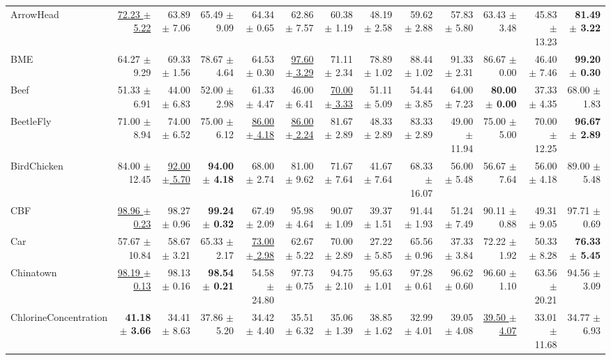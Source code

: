 \begin{landscape}
\begin{longtable}{lrrrrrrrrrrrr}
ArrowHead & \underline{72.23 $\pm$ 5.22} & 63.89 $\pm$ 7.06 & 65.49 $\pm$ 9.09 & 64.34 $\pm$ 0.65 & 62.86 $\pm$ 7.57 & 60.38 $\pm$ 1.19 & 48.19 $\pm$ 2.58 & 59.62 $\pm$ 2.88 & 57.83 $\pm$ 5.80 & 63.43 $\pm$ 3.48 & 45.83 $\pm$ 13.23 & \textbf{81.49 $\pm$ 3.22} \\
BME & 64.27 $\pm$ 9.29 & 69.33 $\pm$ 1.56 & 78.67 $\pm$ 4.64 & 64.53 $\pm$ 0.30 & \underline{97.60 $\pm$ 3.29} & 71.11 $\pm$ 2.34 & 78.89 $\pm$ 1.02 & 88.44 $\pm$ 1.02 & 91.33 $\pm$ 2.31 & 86.67 $\pm$ 0.00 & 46.40 $\pm$ 7.46 & \textbf{99.20 $\pm$ 0.30} \\
Beef & 51.33 $\pm$ 6.91 & 44.00 $\pm$ 6.83 & 52.00 $\pm$ 2.98 & 61.33 $\pm$ 4.47 & 46.00 $\pm$ 6.41 & \underline{70.00 $\pm$ 3.33} & 51.11 $\pm$ 5.09 & 54.44 $\pm$ 3.85 & 64.00 $\pm$ 7.23 & \textbf{80.00 $\pm$ 0.00} & 37.33 $\pm$ 4.35 & 68.00 $\pm$ 1.83 \\
BeetleFly & 71.00 $\pm$ 8.94 & 74.00 $\pm$ 6.52 & 75.00 $\pm$ 6.12 & \underline{86.00 $\pm$ 4.18} & \underline{86.00 $\pm$ 2.24} & 81.67 $\pm$ 2.89 & 48.33 $\pm$ 2.89 & 83.33 $\pm$ 2.89 & 49.00 $\pm$ 11.94 & 75.00 $\pm$ 5.00 & 70.00 $\pm$ 12.25 & \textbf{96.67 $\pm$ 2.89} \\
BirdChicken & 84.00 $\pm$ 12.45 & \underline{92.00 $\pm$ 5.70} & \textbf{94.00 $\pm$ 4.18} & 68.00 $\pm$ 2.74 & 81.00 $\pm$ 9.62 & 71.67 $\pm$ 7.64 & 41.67 $\pm$ 7.64 & 68.33 $\pm$ 16.07 & 56.00 $\pm$ 5.48 & 56.67 $\pm$ 7.64 & 56.00 $\pm$ 4.18 & 89.00 $\pm$ 5.48 \\
CBF & \underline{98.96 $\pm$ 0.23} & 98.27 $\pm$ 0.96 & \textbf{99.24 $\pm$ 0.32} & 67.49 $\pm$ 2.09 & 95.98 $\pm$ 4.64 & 90.07 $\pm$ 1.09 & 39.37 $\pm$ 1.51 & 91.44 $\pm$ 1.93 & 51.24 $\pm$ 7.49 & 90.11 $\pm$ 0.88 & 49.31 $\pm$ 9.05 & 97.71 $\pm$ 0.69 \\
Car & 57.67 $\pm$ 10.84 & 58.67 $\pm$ 3.21 & 65.33 $\pm$ 2.17 & \underline{73.00 $\pm$ 2.98} & 62.67 $\pm$ 5.22 & 70.00 $\pm$ 2.89 & 27.22 $\pm$ 5.85 & 65.56 $\pm$ 0.96 & 37.33 $\pm$ 3.84 & 72.22 $\pm$ 1.92 & 50.33 $\pm$ 8.28 & \textbf{76.33 $\pm$ 5.45} \\
Chinatown & \underline{98.19 $\pm$ 0.13} & 98.13 $\pm$ 0.16 & \textbf{98.54 $\pm$ 0.21} & 54.58 $\pm$ 24.80 & 97.73 $\pm$ 0.75 & 94.75 $\pm$ 2.10 & 95.63 $\pm$ 1.01 & 97.28 $\pm$ 0.61 & 96.62 $\pm$ 0.60 & 96.60 $\pm$ 1.10 & 63.56 $\pm$ 20.21 & 94.56 $\pm$ 3.09 \\
ChlorineConcentration & \textbf{41.18 $\pm$ 3.66} & 34.41 $\pm$ 8.63 & 37.86 $\pm$ 5.20 & 34.42 $\pm$ 4.40 & 35.51 $\pm$ 6.32 & 35.06 $\pm$ 1.39 & 38.85 $\pm$ 1.62 & 32.99 $\pm$ 4.01 & 39.05 $\pm$ 4.08 & \underline{39.50 $\pm$ 4.07} & 33.01 $\pm$ 11.68 & 34.77 $\pm$ 6.93 \\

\end{longtable}
\end{landscape}
